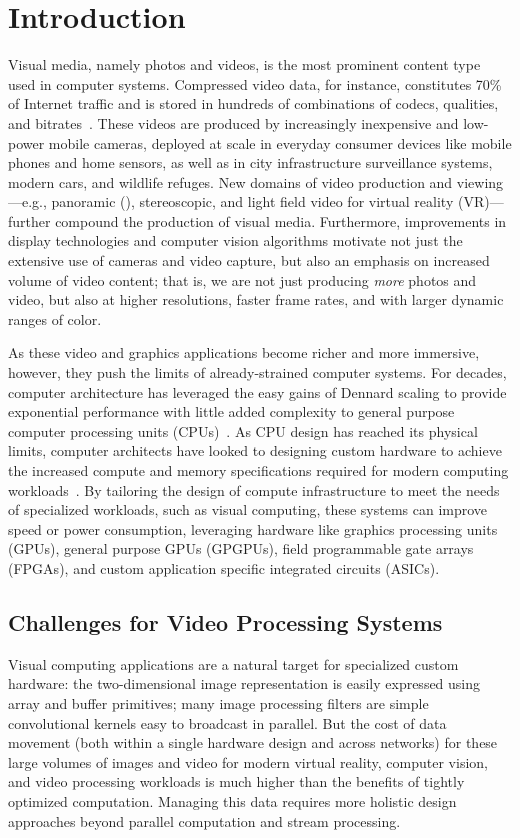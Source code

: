 \chapter{Introduction}\label{ch:introduction}
Visual media, namely photos and videos, is the most prominent content type used in computer systems.
Compressed video data, for instance, constitutes 70\% of Internet traffic and is stored in hundreds of combinations of codecs, qualities, and bitrates~\cite{netflix2015encoding, cisco2017zettabyte}.
These videos are produced by increasingly inexpensive and low-power mobile cameras, deployed at scale in everyday consumer devices like mobile phones and home sensors, as well as in city infrastructure surveillance systems, modern cars, and wildlife refuges.
New domains of video production and viewing---e.g., panoramic (\threesixty), stereoscopic, and light field video for virtual reality (VR)---further compound the production of visual media.
Furthermore, improvements in display technologies and computer vision algorithms motivate not just the extensive use of cameras and video capture, but also an emphasis on increased volume of video content; that is, we are not just producing \emph{more} photos and video, but also at higher resolutions, faster frame rates, and with larger dynamic ranges of color.

As these video and graphics applications become richer and more immersive, however, they push the limits of already-strained computer systems.
For decades, computer architecture has leveraged the easy gains of Dennard scaling to provide exponential performance with little added complexity to general purpose computer processing units (CPUs)~\cite{esmaeilzadeh2011dark}.
As CPU design has reached its physical limits, computer architects have looked to designing custom hardware to achieve the increased compute and memory specifications required for modern computing workloads~\cite{tpu, q100, qadeer}.
By tailoring the design of compute infrastructure to meet the needs of specialized workloads, such as visual computing, these systems can improve speed or power consumption, leveraging hardware like graphics processing units (GPUs), general purpose GPUs (GPGPUs), field programmable gate arrays (FPGAs), and custom application specific integrated circuits (ASICs).

\section{Challenges for Video Processing Systems}
Visual computing applications are a natural target for specialized custom hardware: the two-dimensional image representation is easily expressed using array and buffer primitives; many image processing filters are simple convolutional kernels easy to broadcast in parallel.
But the cost of data movement (both within a single hardware design and across networks) for these large volumes of images and video for modern virtual reality, computer vision, and video processing workloads is much higher than the benefits of tightly optimized computation.
Managing this data requires more holistic design approaches beyond parallel computation and stream processing.

